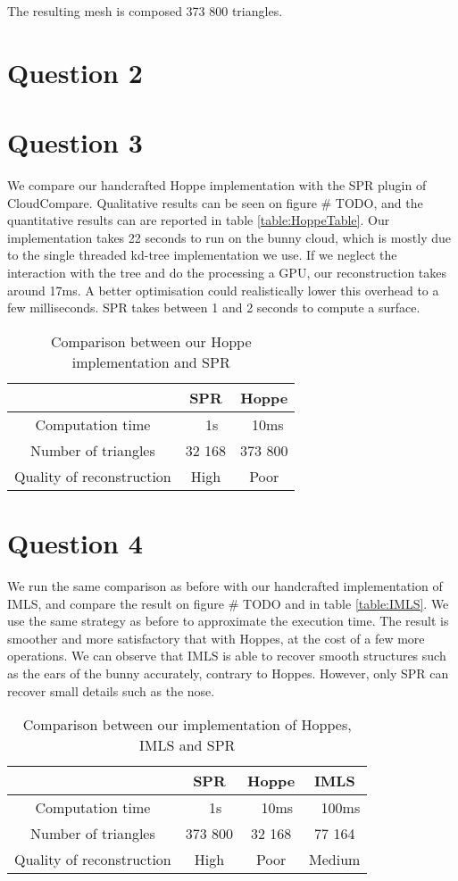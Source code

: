 \documentclass[a4paper]{article}
\begin{document}
The resulting mesh is composed 373 800 triangles.

\section*{Question 2}

\section*{Question 3}
We compare our handcrafted Hoppe implementation with the SPR plugin of CloudCompare.
Qualitative results can be seen on figure # TODO, and the quantitative results can 
are reported in table \ref{table:HoppeTable}. Our implementation takes 22 seconds to run
on the bunny cloud, which is mostly due to the single threaded kd-tree implementation we use.
If we neglect the interaction with the tree and do the processing a GPU,
our reconstruction takes around 17ms. A better optimisation could realistically lower this
overhead to a few milliseconds.
SPR takes between 1 and 2 seconds to compute a surface.

\begin{table}
    \centering
    \begin{tabular}{|c|c|c|}
      \hline
         & SPR & Hoppe \\
      \hline
      Computation time & ~ 1s & ~10ms \\
      Number of triangles & 32 168 & 373 800 \\
      Quality of reconstruction & High & Poor \\
      \hline
    \end{tabular}
    \caption{Comparison between our Hoppe implementation and SPR}
    \label{tab:HoppeTable}
  \end{table}

\section*{Question 4}
We run the same comparison as before with our handcrafted implementation of IMLS,
and compare the result on figure # TODO and in table \ref{table:IMLS}. We use
the same strategy as before to approximate the execution time. The result is
smoother and more satisfactory that with Hoppes, at the cost of a few
more operations. We can observe that IMLS is able to recover smooth structures such
as the ears of the bunny accurately, contrary to Hoppes. However, only SPR can recover small details
such as the nose.

\begin{table}
    \centering
    \begin{tabular}{|c|c|c|c|}
      \hline
         & SPR & Hoppe & IMLS\\
      \hline
      Computation time & ~ 1s & ~ 10ms & ~ 100ms\\
      Number of triangles & 373 800 & 32 168 & 77 164\\
      Quality of reconstruction & High & Poor & Medium\\
      \hline
    \end{tabular}
    \caption{Comparison between our implementation of Hoppes, IMLS and SPR}
    \label{tab:IMLSTable}
  \end{table}
\end{document}
